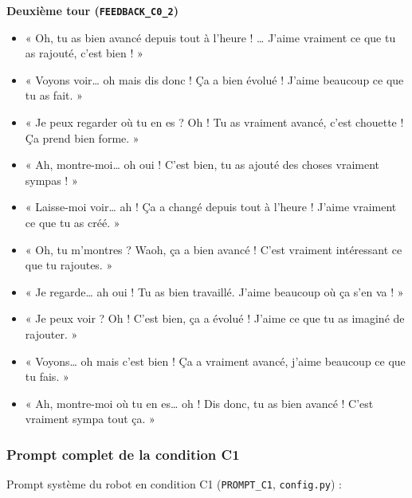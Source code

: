 \documentclass[11pt]{article}
\begin{document}
\textbf{Deuxième tour (\texttt{FEEDBACK\_C0\_2})}
\begin{itemize}[noitemsep]
    \item « Oh, tu as bien avancé depuis tout à l'heure ! … J'aime vraiment ce que tu as rajouté, c'est bien ! »
    \item « Voyons voir… oh mais dis donc ! Ça a bien évolué ! J'aime beaucoup ce que tu as fait. »
    \item « Je peux regarder où tu en es ? Oh ! Tu as vraiment avancé, c'est chouette ! Ça prend bien forme. »
    \item « Ah, montre-moi… oh oui ! C'est bien, tu as ajouté des choses vraiment sympas ! »
    \item « Laisse-moi voir… ah ! Ça a changé depuis tout à l'heure ! J'aime vraiment ce que tu as créé. »
    \item « Oh, tu m'montres ? Waoh, ça a bien avancé ! C'est vraiment intéressant ce que tu rajoutes. »
    \item « Je regarde… ah oui ! Tu as bien travaillé. J'aime beaucoup où ça s'en va ! »
    \item « Je peux voir ? Oh ! C'est bien, ça a évolué ! J'aime ce que tu as imaginé de rajouter. »
    \item « Voyons… oh mais c'est bien ! Ça a vraiment avancé, j'aime beaucoup ce que tu fais. »
    \item « Ah, montre-moi où tu en es… oh ! Dis donc, tu as bien avancé ! C'est vraiment sympa tout ça. »
\end{itemize}

\subsubsection{Prompt complet de la condition C1}
\label{annexe:prompt_c1}

Prompt système du robot en condition C1 (\texttt{PROMPT\_C1}, \texttt{config.py}) :
\end{document}
